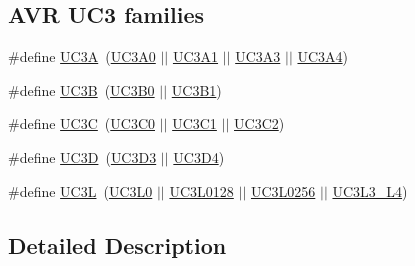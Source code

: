 \subsection*{A\-V\-R U\-C3 families}
\begin{DoxyCompactItemize}
\item 
\#define \hyperlink{group__uc3__part__macros__group_gaf7f16cc2bde7daf34576983fee8824c8}{U\-C3\-A}~(\hyperlink{group__uc3__part__macros__group_gaee4dd9ce50cc26707d159660db9fc408}{U\-C3\-A0} $|$$|$ \hyperlink{group__uc3__part__macros__group_gacbe47eb7ac7d6e655d45657bffab3af6}{U\-C3\-A1} $|$$|$ \hyperlink{group__uc3__part__macros__group_gae08aa32db9bd4a60a8cfa222f7ff74cc}{U\-C3\-A3} $|$$|$ \hyperlink{group__uc3__part__macros__group_ga633294c4776386c15ab2050644e77b4f}{U\-C3\-A4})
\item 
\#define \hyperlink{group__uc3__part__macros__group_ga61e51606324c212eb11079e5acf592e0}{U\-C3\-B}~(\hyperlink{group__uc3__part__macros__group_ga701194230718f73a89efc39742e061af}{U\-C3\-B0} $|$$|$ \hyperlink{group__uc3__part__macros__group_ga96602eec1c923afe92a64d807a242cd7}{U\-C3\-B1})
\item 
\#define \hyperlink{group__uc3__part__macros__group_gac7a13b9ceb67804d94b6a8967512ee71}{U\-C3\-C}~(\hyperlink{group__uc3__part__macros__group_ga4519bacce7868e73227b94af6e2a1b7f}{U\-C3\-C0} $|$$|$ \hyperlink{group__uc3__part__macros__group_ga775cb0ff401f59a6062a4513ce6a65e6}{U\-C3\-C1} $|$$|$ \hyperlink{group__uc3__part__macros__group_ga74bddd178c8022709acca0ad80ff4db8}{U\-C3\-C2})
\item 
\#define \hyperlink{group__uc3__part__macros__group_ga351a876f40669641e6ba9620909143d3}{U\-C3\-D}~(\hyperlink{group__uc3__part__macros__group_ga432af70c4d53fc917770e4ce48440613}{U\-C3\-D3} $|$$|$ \hyperlink{group__uc3__part__macros__group_gae271cf5f4b9459baea7216c071e02d76}{U\-C3\-D4})
\item 
\#define \hyperlink{group__uc3__part__macros__group_gac8a7d715e500aa74cd05e0f0fc5bb005}{U\-C3\-L}~(\hyperlink{group__uc3__part__macros__group_ga4a399e061cd2bf1088c01a22f69cf6c1}{U\-C3\-L0} $|$$|$ \hyperlink{group__uc3__part__macros__group_ga2acf2e6f59e322e343123ad12fe89c2c}{U\-C3\-L0128} $|$$|$ \hyperlink{group__uc3__part__macros__group_gaa8ab88d4e48e7936416c4475b42e5b49}{U\-C3\-L0256} $|$$|$ \hyperlink{group__uc3__part__macros__group_gae4dccd708991a86a5e8598b0c72d6bbd}{U\-C3\-L3\-\_\-\-L4})
\end{DoxyCompactItemize}


\subsection{Detailed Description}


